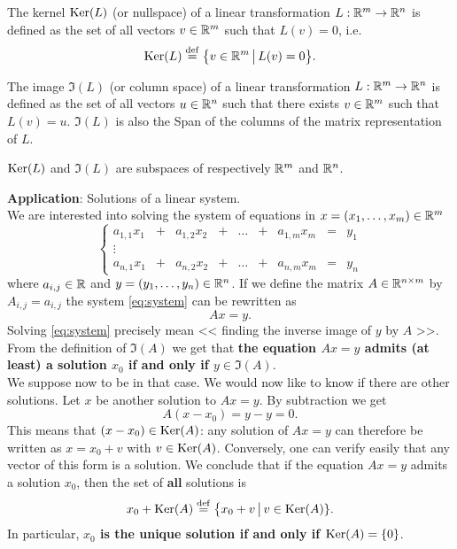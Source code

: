 \documentclass[11pt,nocut]{article}
\begin{document}
\begin{definition}[Kernel]
	The kernel ${{\rm Ker}}(L)$ (or nullspace) of a linear transformation $L: \mathbb{R}^m \to \mathbb{R}^n$ is defined as the set of all vectors $v \in \mathbb{R}^m$ such that $L(v) = 0$, i.e.
	$$
	{{\rm Ker}}(L) \overset{\rm def}{=} \big\{ v \in \mathbb{R}^m \, \big| \, L(v) = 0 \big\}.
	$$
\end{definition}

\begin{definition}[Image]
	The image $\Im(L)$ (or column space) of a linear transformation $L: \mathbb{R}^m \to \mathbb{R}^n$ is defined as the set of all vectors $u \in \mathbb{R}^n$ such that there exists $v \in \mathbb{R}^m$ such that $L(v) = u$. 
	$\Im(L)$ is also the Span of the columns of the matrix representation of $L$.
\end{definition}

\begin{proposition}
	${{\rm Ker}}(L)$ and $\Im(L)$ are subspaces of respectively $\mathbb{R}^m$ and $\mathbb{R}^n$.
\end{proposition}
\vspace{1cm}

\noindent
\textbf{Application}: Solutions of a linear system.
\\

We are interested into solving the system of equations in $x = (x_1, \dots, x_m) \in \mathbb{R}^m$
\begin{equation}\label{eq:system}
	\left\{
		\begin{array}{ccccccccc}
		a_{1,1} x_1 &+& a_{1,2} x_2 &+& \dots &+& a_{1,m} x_m &=& y_1 \\
		\vdots &&&&&&&& \\
		a_{n,1} x_1 &+& a_{n,2} x_2 &+& \dots &+& a_{n,m} x_m &=& y_n
	\end{array}
	\right.
\end{equation}
where $a_{i,j} \in \mathbb{R}$ and $y = (y_1, \dots, y_n) \in \mathbb{R}^n$. If we define the matrix $A \in \mathbb{R}^{n \times m}$ by $A_{i,j} = a_{i,j}$ the system \eqref{eq:system} can be rewritten as
$$
A x = y.
$$
Solving \eqref{eq:system} precisely mean << finding the inverse image of $y$ by $A$ >>. From the definition of $\Im(A)$ we get that 
\textbf{the equation $Ax = y$ admits (at least) a solution $x_0$ if and only if $y \in \Im(A)$}.
\\

We suppose now to be in that case. We would now like to know if there are other solutions. Let $x$ be another solution to $Ax = y$. By subtraction we get 
$$
A(x - x_0) = y - y = 0.
$$
This means that $(x - x_0) \in {{\rm Ker}}(A)$: any solution of $Ax = y$ can therefore be written as $x = x_0 + v$ with $v \in {{\rm Ker}}(A)$. Conversely, one can verify easily that any vector of this form is a solution. We conclude that if the equation $Ax = y$ admits a solution $x_0$, then the set of \textbf{all} solutions is
$$
x_0 + {{\rm Ker}}(A) \overset{\rm def}{=} \big\{ x_0 + v \, \big| \, v \in {{\rm Ker}}(A) \}.
$$
In particular, \textbf{$x_0$ is the unique solution if and only if ${{\rm Ker}}(A) = \{0\}$}.



	\vspace{1cm}
	\centerline{}

%
%
\end{document}

